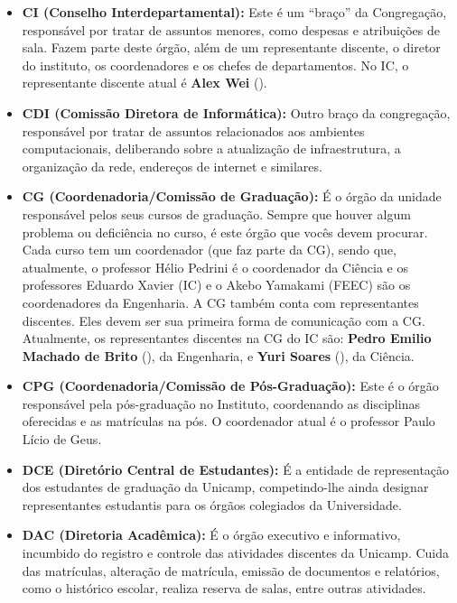 \begin{itemize}
    \item  \textbf{CI (Conselho Interdepartamental):} Este é um ``braço'' da
        Congregação, responsável por tratar de assuntos menores, como despesas e
        atribuições de sala. Fazem parte deste órgão, além de um representante
        discente, o diretor do instituto, os coordenadores e os chefes de
        departamentos. No IC, o representante discente atual é \textbf{Alex
        Wei} (). 

    \item  \textbf{CDI (Comissão Diretora de Informática):} Outro braço da
        congregação, responsável por tratar de assuntos relacionados aos
        ambientes computacionais, deliberando sobre a atualização de
        infraestrutura, a organização da rede, endereços de internet e
        similares.

    \item  \textbf{CG (Coordenadoria/Comissão de Graduação):} É o órgão da
        unidade responsável pelos seus cursos de graduação. Sempre que houver
        algum problema ou deficiência no curso, é este órgão que vocês devem
        procurar.  Cada curso tem um coordenador (que faz parte da CG), sendo
        que, atualmente, o professor Hélio Pedrini é o coordenador da Ciência e
        os professores Eduardo Xavier (IC) e o Akebo Yamakami (FEEC) são os
        coordenadores da Engenharia. A CG também conta com representantes
        discentes. Eles devem ser sua primeira forma de comunicação com a CG.
        Atualmente, os representantes discentes na CG do IC são: \textbf{Pedro
        Emilio Machado de Brito} (), da
        Engenharia, e \textbf{Yuri Soares} (),
        da Ciência. 

    \item  \textbf{CPG (Coordenadoria/Comissão de Pós-Graduação):} Este é o
        órgão responsável pela pós-graduação no Instituto, coordenando as
        disciplinas oferecidas e as matrículas na pós. O coordenador atual é o
        professor Paulo Lício de Geus.

    \item  \textbf{DCE (Diretório Central de Estudantes):} É a entidade de
        representação dos estudantes de graduação da Unicamp, competindo-lhe
        ainda designar representantes estudantis para os órgãos colegiados da
        Universidade.

    \item  \textbf{DAC (Diretoria Acadêmica):} É o órgão executivo e
        informativo, incumbido do registro e controle das atividades discentes
        da Unicamp. Cuida das matrículas, alteração de matrícula, emissão de
        documentos e relatórios, como o histórico escolar, realiza reserva de
        salas, entre outras atividades.


\end{itemize}
